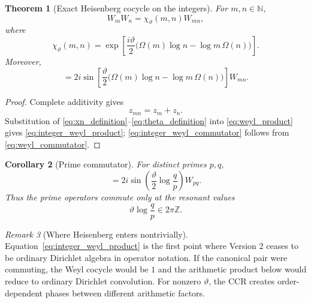 \documentclass[11pt]{amsart}
\numberwithin{equation}{section}
\theoremstyle{plain}
\newtheorem{theorem}{Theorem}[section]
\newtheorem{corollary}[theorem]{Corollary}
\theoremstyle{definition}
\theoremstyle{remark}
\newtheorem{remark}[theorem]{Remark}
\newcommand{\N}{\mathbb{N}}
\newcommand{\Om}{\Omega}
\begin{document}
\begin{theorem}[Exact Heisenberg cocycle on the integers]
\label{thm:integer_weyl_cocycle}
For $m,n\in\N$,
\begin{equation}
W_mW_n
=
\chi_{\vartheta}(m,n)W_{mn},
\label{eq:integer_weyl_product}
\end{equation}
where
\begin{equation}
\chi_{\vartheta}(m,n)
=
\exp\!\left[
\frac{i\vartheta}{2}
\bigl(\Om(m)\log n-\log m\,\Om(n)\bigr)
\right].
\label{eq:chi_definition}
\end{equation}
Moreover,
\begin{equation}
[W_m,W_n]
=
2i\sin\!\left[
\frac{\vartheta}{2}
\bigl(\Om(m)\log n-\log m\,\Om(n)\bigr)
\right]W_{mn}.
\label{eq:integer_weyl_commutator}
\end{equation}
\end{theorem}

\begin{proof}
Complete additivity gives
\begin{equation}
z_{mn}=z_m+z_n.
\label{eq:phase_space_additivity}
\end{equation}
Substitution of \eqref{eq:xn_definition}--\eqref{eq:theta_definition} into
\eqref{eq:weyl_product} gives \eqref{eq:integer_weyl_product};
\eqref{eq:integer_weyl_commutator} follows from
\eqref{eq:weyl_commutator}.
\end{proof}

\begin{corollary}[Prime commutator]
\label{cor:prime_commutator}
For distinct primes $p,q$,
\begin{equation}
[W_p,W_q]
=
2i\sin\!\left(\frac{\vartheta}{2}\log\frac{q}{p}\right)W_{pq}.
\label{eq:prime_commutator}
\end{equation}
Thus the prime operators commute only at the resonant values
\begin{equation}
\vartheta\log\frac{q}{p}\in2\pi\mathbb Z.
\label{eq:prime_commutation_resonance}
\end{equation}
\end{corollary}

\begin{remark}[Where Heisenberg enters nontrivially]
\label{rem:where_heisenberg_enters}
Equation~\eqref{eq:integer_weyl_product} is the first point where Version 2
ceases to be ordinary Dirichlet algebra in operator notation.  If the
canonical pair were commuting, the Weyl cocycle would be $1$ and the
arithmetic product below would reduce to ordinary Dirichlet convolution.
For nonzero $\vartheta$, the CCR creates order-dependent phases between
different arithmetic factors.
\end{remark}
\end{document}

